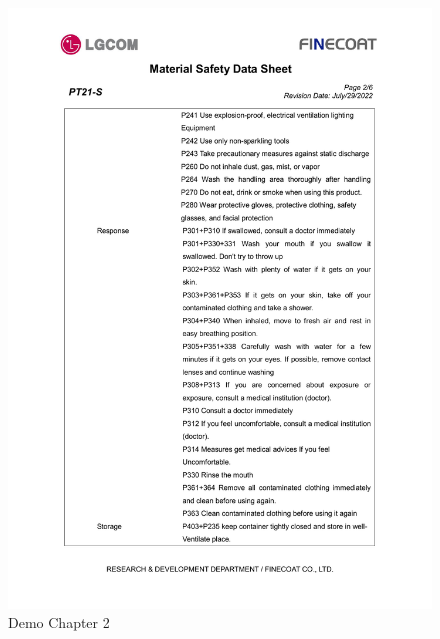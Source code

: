 \documentclass[a4paper,12pt,twoside]{report}
\begin{document}
\begin{figure}[H]
		\includegraphics[width=\textwidth, keepaspectratio]{images/chaps2}
	\caption[Demo Chapter 2 .ctd]{Demo Chapter 2}
\label{chaps2}
\end{figure}
\end{document}

